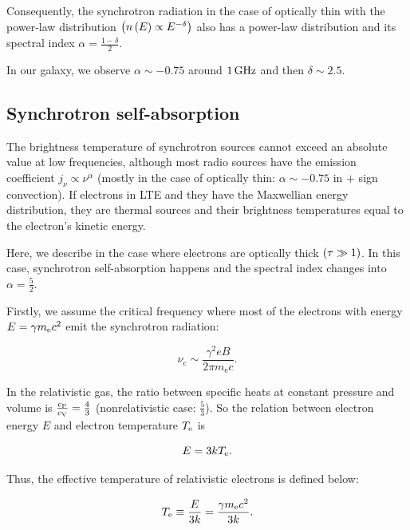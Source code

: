Consequently, the synchrotron radiation in the case of optically thin with the power-law distribution $\left(n\left(E\right) \propto E^{-\delta}\right)$ also has a power-law distribution and its spectral index $\alpha = \frac{1-\delta}{2}$.

In our galaxy, we observe $\alpha\sim-0.75$ around $1\,\mathrm{GHz}$ and then $\delta \sim 2.5$.



\subsection{Synchrotron self-absorption}\label{synchrotronselfabsorption}

The brightness temperature of synchrotron sources cannot exceed an absolute value at low frequencies, although most radio sources have the emission coefficient $j_{\nu} \propto \nu^{\alpha}$ (mostly in the case of optically thin: $\alpha\sim-0.75$ in $+$ sign convection).
If electrons in LTE and they have the Maxwellian energy distribution, they are thermal sources and their brightness temperatures equal to the electron's kinetic energy.

Here, we describe in the case where electrons are optically thick $\left(\tau \gg 1\right)$.
In this case, synchrotron self-absorption happens and the spectral index changes into $\alpha = \frac{5}{2}$.

Firstly, we assume the critical frequency where most of the electrons with energy $E = \gamma m_{\mathrm{e}} c^2$ emit the synchrotron radiation:

\begin{equation}\label{eq:essential_radio5n80}
    \nu_{\mathrm{c}} \sim \frac{\gamma^{2} e B}{2 \pi m_{\mathrm{e}} c}.
\end{equation}

In the relativistic gas, the ratio between specific heats at constant pressure and volume is $\frac{c_{\mathrm{P}}}{c_{\mathrm{V}}}=\frac{4}{3}$ (nonrelativistic case: $\frac{5}{3}$).
So the relation between electron energy $E$ and electron temperature $T_{\mathrm{e}}$ is

\begin{equation}\label{eq:essential_radio5n82}
    E=3 k T_{\mathrm{e}}.
\end{equation}

Thus, the effective temperature of relativistic electrons is defined below:

\begin{equation}\label{eq:essential_radio5n83}
    T_{\mathrm{e}} \equiv \frac{E}{3 k}=\frac{\gamma m_{\mathrm{e}} c^2}{3 k}.
\end{equation}

